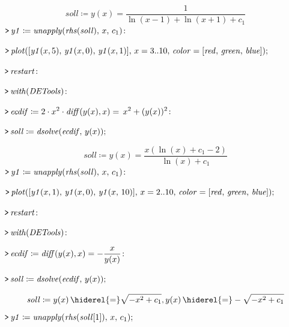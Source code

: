 \documentclass{article}
\begin{document}
\begin{dmath}\label{(2)}
\mathit{soll} \coloneqq y \! \left(x \right)=\frac{1}{\ln \! \left(x -1\right)+\ln \! \left(x +1\right)+c_{1}}
\end{dmath}
\mapleinput
{$ \displaystyle \texttt{>\,} \mathit{y1} \coloneqq \mathit{unapply} (\mathit{rhs} (\mathit{soll}),\,x ,\,c_{1})\colon  $}

\mapleinput
{$ \displaystyle \texttt{>\,} \mathit{plot} ([\mathit{y1} (x ,5),\,\mathit{y1} (x ,0),\,\mathit{y1} (x ,1)],\,x =3..10,\,\mathit{color} =[\mathit{red} ,\,\mathit{green} ,\,\mathit{blue}]); $}

{}
\mapleinput
{$ \displaystyle \texttt{>\,} \mathit{restart} \colon  $}

\mapleinput
{$ \displaystyle \texttt{>\,} \mathit{with} (\mathit{DETools})\colon  $}

\mapleinput
{$ \displaystyle \texttt{>\,} \mathit{ecdif} \coloneqq 2\cdot x^{2}\cdot \mathit{diff} (y (x),x)=\,x^{2}+(y (x))^{2}\colon  $}

\mapleinput
{$ \displaystyle \texttt{>\,} \mathit{soll} \coloneqq \mathit{dsolve} (\mathit{ecdif} ,\,y (x)); $}

\begin{dmath}\label{(3)}
\mathit{soll} \coloneqq y \! \left(x \right)=\frac{x \left(\ln \! \left(x \right)+c_{1}-2\right)}{\ln \! \left(x \right)+c_{1}}
\end{dmath}
\mapleinput
{$ \displaystyle \texttt{>\,} \mathit{y1} \coloneqq \mathit{unapply} (\mathit{rhs} (\mathit{soll}),\,x ,\,c_{1})\colon  $}

\mapleinput
{$ \displaystyle \texttt{>\,} \mathit{plot} ([\mathit{y1} (x ,1),\,\mathit{y1} (x ,0),\,\mathit{y1} (x ,\,10)],\,x =2..10,\,\mathit{color} =[\mathit{red} ,\,\mathit{green} ,\,\mathit{blue}]); $}

{}
\mapleinput
{$ \displaystyle \texttt{>\,} \mathit{restart} \colon  $}

\mapleinput
{$ \displaystyle \texttt{>\,} \mathit{with} (\mathit{DETools})\colon  $}

\mapleinput
{$ \displaystyle \texttt{>\,} \mathit{ecdif} \coloneqq \mathit{diff} (y (x),x)=-\frac{x}{y (x)}\colon  $}

\mapleinput
{$ \displaystyle \texttt{>\,} \mathit{soll} \coloneqq \mathit{dsolve} (\mathit{ecdif} ,\,y (x)); $}

\begin{dmath}\label{(4)}
\mathit{soll} \coloneqq y \! \left(x \right) \hiderel{=} \sqrt{-x^{2}+c_{1}},y \! \left(x \right) \hiderel{=} -\sqrt{-x^{2}+c_{1}}
\end{dmath}
\mapleinput
{$ \displaystyle \texttt{>\,} \mathit{y1} \coloneqq \mathit{unapply} (\mathit{rhs} (\mathit{soll} [1]),\,x ,\,c_{1}); $}
\end{document}
